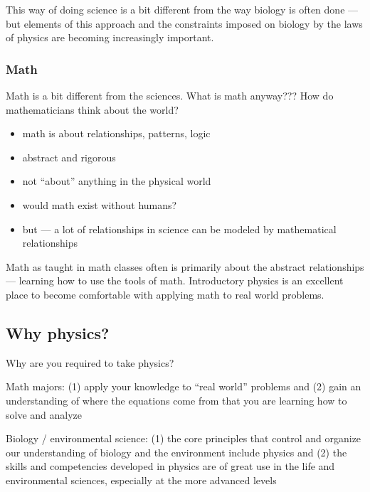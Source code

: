This way of doing science is a bit different from the way biology is often done --- but elements of this approach and the constraints imposed on biology by the laws of physics are becoming increasingly important.

\subsubsection{Math}
Math is a bit different from the sciences. What is math anyway??? How do mathematicians think about the world?

\begin{itemize}
  \item math is about relationships, patterns, logic
  \item abstract and rigorous
  \item not ``about'' anything in the physical world
  \item would math exist without humans?
  \item but --- a lot of relationships in science can be modeled by mathematical relationships
\end{itemize}

Math as taught in math classes often is primarily about the abstract relationships --- learning how to use the tools of math. Introductory physics is an excellent place to become comfortable with applying math to real world problems.


\subsection{Why physics?}
Why are you required to take physics?

Math majors: (1) apply your knowledge to ``real world'' problems and (2) gain an understanding of where the equations come from that you are learning how to solve and analyze

Biology / environmental science: (1) the core principles that control and organize our understanding of biology and the environment include physics and (2) the skills and competencies developed in physics are of great use in the life and environmental sciences, especially at the more advanced levels


